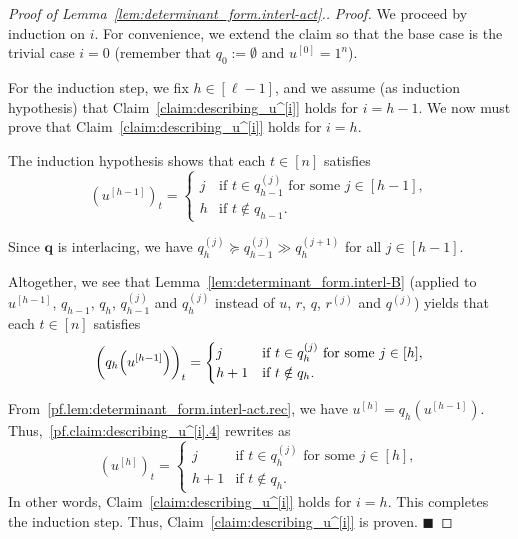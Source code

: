 \documentclass[reqno]{amsart}
\newcommand{\0}{\phantom{c}}
\newcommand{\qq}{\mathbf{q}}
\newenvironment{subproof}{\textit{Proof.} }{\hfill$\blacksquare$ \medskip}
\newcommand{\ive}[1]{\left[ #1 \right]}
\theoremstyle{plain}
\theoremstyle{definition}
\numberwithin{equation}{section}
\begin{document}
\begin{proof}[Proof of Lemma~\ref{lem:determinant_form.interl-act}.]
\begin{subproof}
We proceed by induction on $i$.
For convenience, we extend the claim so that the base case is the trivial case $i = 0$ (remember that $q_0 := \emptyset$ and $u^{\left[  0\right]} = 1^n$).

For the induction step, we fix $h \in \ive{\ell-1}$, and we assume (as induction hypothesis) that Claim~\ref{claim:describing_u^[i]} holds for $i = h - 1$.
We now must prove that Claim~\ref{claim:describing_u^[i]} holds for $i = h$.

The induction hypothesis shows that each $t \in \ive{n}$ satisfies
\begin{equation}
\label{pf.claim:describing_u^[i].IH}
\left( u^{\left[  h-1\right]} \right)_t =
\begin{cases}
j & \text{if } t \in q_{h-1}^{(j)} \text{ for some } j \in\ive{h-1}\!, \\
h & \text{if } t \notin q_{h-1} .
\end{cases}
\end{equation}

Since $\qq$ is interlacing, we have
$q_h^{(j)} \succeq q_{h-1}^{(j)} \gg q_h^{(j+1)}$ for all $j \in \ive{h-1}$.

Altogether, we see that Lemma~\ref{lem:determinant_form.interl-B} (applied to $u^{\left[  h-1\right]  }$, $q_{h-1}$, $q_h$, $q_{h-1}^{(j)}$ and $q_h^{(j)}$ instead of $u$, $r$, $q$, $r^{(j)}$ and $q^{(j)}$) yields that each $t \in \ive{n}$ satisfies
\begin{equation}
\label{pf.claim:describing_u^[i].4}
\biggl( q_h\Bigl(  u^{\left[  h-1\right]  }\Bigr) \biggr)_t =
\begin{cases}
j & \text{if } t \in q_h^{(j)} \text{ for some } j \in\ive{h}\!, \\
h+1 & \text{if } t \notin q_h .
\end{cases}
\end{equation}

From~\eqref{pf.lem:determinant_form.interl-act.rec}, we have
$u^{\left[  h\right]} = q_h( u^{\left[  h-1\right]  } )$.
Thus,~\eqref{pf.claim:describing_u^[i].4} rewrites as
\[
\left( u^{\left[  h\right]} \right)_t =
\begin{cases}
j & \text{if } t \in q_h^{(j)} \text{ for some } j \in\ive{h}\!, \\
h+1 & \text{if } t \notin q_h .
\end{cases}
\]
In other words, Claim~\ref{claim:describing_u^[i]} holds for $i = h$.
This completes the induction step.
Thus, Claim~\ref{claim:describing_u^[i]} is proven.
\end{subproof}


\end{proof}
\end{document}
